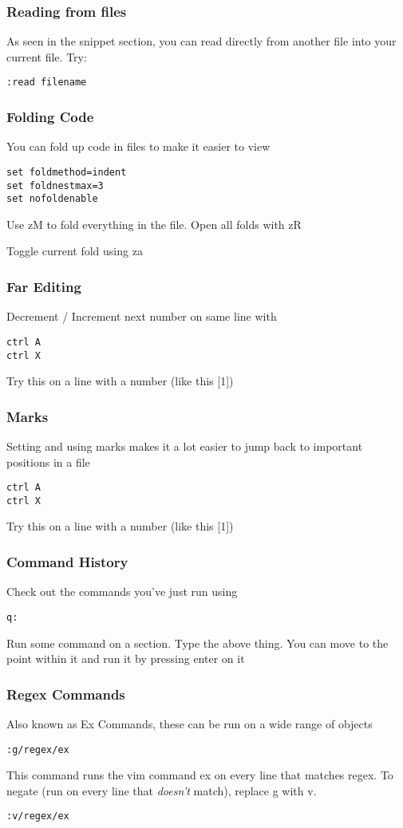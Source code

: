 \documentclass[12pt, letterpaper]{article}
\begin{document}
\subsubsection{Reading from files}
As seen in the snippet section, you can read directly from another file into
your current file. Try:

\begin{verbatim}
:read filename
\end{verbatim}

\subsubsection{Folding Code}
You can fold up code in files to make it easier to view
\begin{verbatim}
set foldmethod=indent
set foldnestmax=3
set nofoldenable
\end{verbatim}
Use zM to fold everything in the file. Open all folds with zR

Toggle current fold using za

\subsubsection{Far Editing}
Decrement / Increment next number on same line with 
\begin{verbatim}
ctrl A
ctrl X
\end{verbatim}
Try this on a line with a number (like this [1])

\subsubsection{Marks}
Setting and using marks makes it a lot easier to jump back to important
positions in a file
\begin{verbatim}
ctrl A
ctrl X
\end{verbatim}
Try this on a line with a number (like this [1])

\subsubsection{Command History}
Check out the commands you've just run using
\begin{verbatim}
q:
\end{verbatim}
Run some command on a section. Type the above thing. You can move to the point
within it and run it by pressing enter on it


\subsubsection{Regex Commands}
Also known as Ex Commands, these can be run on a wide range of objects
\begin{verbatim}
:g/regex/ex
\end{verbatim}
This command runs the vim command ex on every line that matches regex.
To negate (run on every line that \textit{doesn't} match), replace g with v.
\begin{verbatim}
:v/regex/ex
\end{verbatim}
\end{document}

